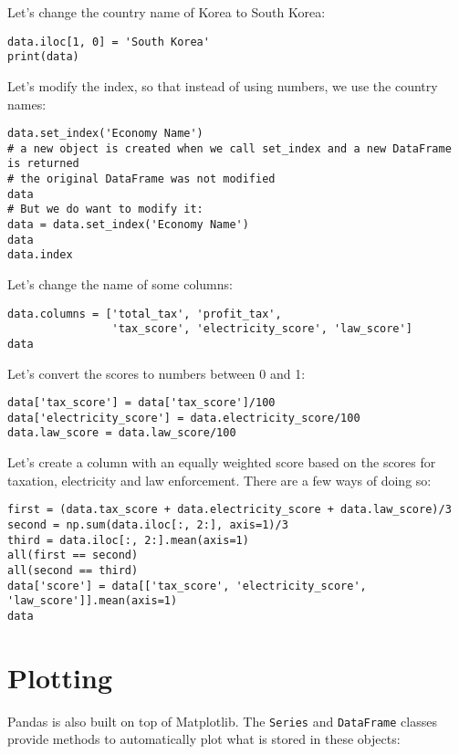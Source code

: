 \documentclass[12pt, a4paper]{article}
\begin{document}
Let's change the country name of Korea to South Korea:
\lstset{language=jupyter-python,label= ,caption= ,captionpos=b,numbers=none}
\begin{lstlisting}
data.iloc[1, 0] = 'South Korea'
print(data)
\end{lstlisting}

Let's modify the index, so that instead of using numbers, we use the country names:
\lstset{language=jupyter-python,label= ,caption= ,captionpos=b,numbers=none}
\begin{lstlisting}
data.set_index('Economy Name')
# a new object is created when we call set_index and a new DataFrame is returned
# the original DataFrame was not modified
data
# But we do want to modify it:
data = data.set_index('Economy Name')
data
data.index
\end{lstlisting}

Let's change the name of some columns:
\lstset{language=jupyter-python,label= ,caption= ,captionpos=b,numbers=none}
\begin{lstlisting}
data.columns = ['total_tax', 'profit_tax',
                'tax_score', 'electricity_score', 'law_score']
data
\end{lstlisting}

Let's convert the scores to numbers between 0 and 1:
\lstset{language=jupyter-python,label= ,caption= ,captionpos=b,numbers=none}
\begin{lstlisting}
data['tax_score'] = data['tax_score']/100
data['electricity_score'] = data.electricity_score/100
data.law_score = data.law_score/100
\end{lstlisting}

Let's create a column with an equally weighted score based on the scores for taxation, electricity and law enforcement.
There are a few ways of doing so:
\lstset{language=jupyter-python,label= ,caption= ,captionpos=b,numbers=none}
\begin{lstlisting}
first = (data.tax_score + data.electricity_score + data.law_score)/3
second = np.sum(data.iloc[:, 2:], axis=1)/3
third = data.iloc[:, 2:].mean(axis=1)
all(first == second)
all(second == third)
data['score'] = data[['tax_score', 'electricity_score', 'law_score']].mean(axis=1)
data
\end{lstlisting}
\section{Plotting}
\label{sec:org71e54f5}
Pandas is also built on top of Matplotlib.
The \texttt{Series} and \texttt{DataFrame} classes provide methods to automatically plot what is stored in these objects:
\end{document}
